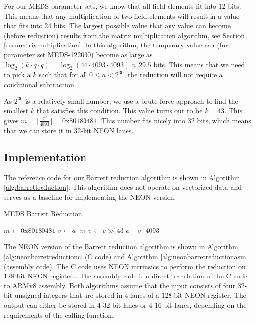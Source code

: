 \documentclass[11pt,a4paper]{report}
\theoremstyle{definition}
\begin{document}
For our MEDS parameter sets, we know that all field elements fit into 12 bits. This means that any multiplication of two field elements will result in a value that fits into 24 bits. The largest possible value that any value can become (before reduction) results from the matrix multiplication algorithm, see Section \ref{sec:matrixmultiplication}. In this algorithm, the temporary value can (for parameter set MEDS-122000) become as large as $\log_2(k \cdot q \cdot q) = \log_2(44 \cdot 4093 \cdot 4093) \approx 29.5$ bits. This means that we need to pick a $k$ such that for all $0 \leq a < 2^{30}$, the reduction will not require a conditional subtraction.

As $2^{30}$ is a relatively small number, we use a brute force approach to find the smallest $k$ that satisfies this condition. This value turns out to be $k = 43$. This gives $m = \lceil \frac{2^{43}}{4093} \rceil = 0\text{x}80180481$. This number fits nicely into 32 bits, which means that we can store it in 32-bit NEON lanes.

\subsection{Implementation}
The reference code for our Barrett reduction algorithm is shown in Algorithm \ref{alg:barrettreduction}. This algorithm does not operate on vectorized data and serves as a baseline for implementing the NEON version.

\begin{algorithm}
  \caption{MEDS Barrett Reduction}
  \label{alg:barrettreduction}
  \begin{algorithmic}
      \State $m \gets 0\text{x}80180481$
      \State $v \gets a \cdot m$
      \State $v \gets v \gg 43$
      \State \Return $a - v \cdot 4093$
    \EndFunction
  \end{algorithmic}
\end{algorithm}

The NEON version of the Barrett reduction algorithm is shown in Algorithm \ref{alg:neonbarretreductionc} (C code) and Algorithm \ref{alg:neonbarretreductionasm} (assembly code). The C code uses NEON intrinsics to perform the reduction on 128-bit NEON registers. The assembly code is a direct translation of the C code to ARMv8 assembly. Both algorithms assume that the input consists of four 32-bit unsigned integers that are stored in 4 lanes of a 128-bit NEON register. The output can either be stored in 4 32-bit lanes or 4 16-bit lanes, depending on the requirements of the calling function.
\end{document}
